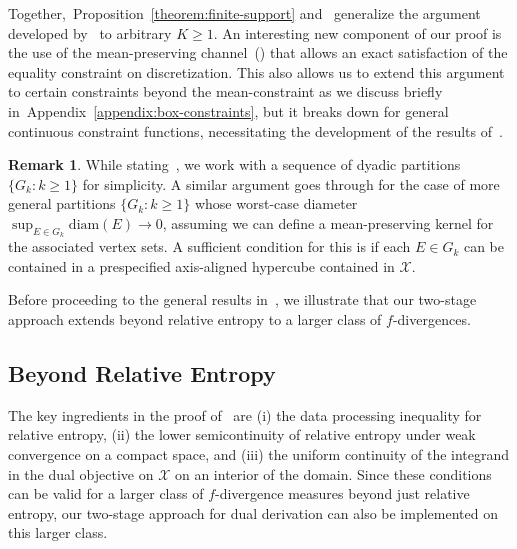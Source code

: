 \documentclass{article}
\theoremstyle{plain}
\theoremstyle{definition}
\newtheorem{remark}[remark]{Remark}
\newcommand{\calX}{\mathcal X}
\begin{document}
Together,~Proposition~\ref{theorem:finite-support} and~ generalize the argument developed by~\citet{honda2010asymptotically} to arbitrary $K \geq 1$. An interesting new component of our proof is the use of the mean-preserving channel~() that allows an exact satisfaction of the equality constraint on discretization. This also allows us to extend this argument to certain constraints beyond the mean-constraint as we discuss briefly in~Appendix~\ref{appendix:box-constraints}, but it breaks down for general continuous constraint functions, necessitating the development of the results of~.  

\begin{remark}
    \label{remark:continuous-klinf-1}
    While stating~, we work with a sequence of dyadic partitions $\{G_k: k \geq 1\}$ for simplicity. A similar argument goes through for the case of more general partitions $\{G_k: k \geq 1\}$ whose worst-case diameter $\sup_{E \in G_k} \mathrm{diam}(E) \to 0$, assuming we can define a mean-preserving kernel for the associated vertex sets. A sufficient condition for this is if each $E \in G_k$ can be contained in a prespecified axis-aligned hypercube contained in $\calX$. 
\end{remark}
Before proceeding to the general results in~, we illustrate that our two-stage approach extends beyond relative entropy to a larger class of $f$-divergences. 

\subsection{Beyond Relative Entropy}
\label{subsec:other-divergences}
    The key ingredients in the proof of~ are (i) the data processing inequality for relative entropy, (ii) the lower semicontinuity of relative entropy under weak convergence on a compact space, and (iii) the uniform continuity of the integrand in the dual objective on $\calX$ on an interior of the domain. Since these conditions can be valid for a larger class of $f$-divergence measures  beyond just relative entropy, our two-stage approach for dual derivation can also be implemented on  this larger class. 
\end{document}
